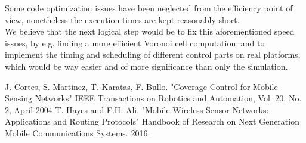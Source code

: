 \documentclass[a4paper,11pt,oneside]{book}
\begin{document}
	Some code optimization issues have been neglected from the efficiency point of view, nonetheless the execution times are kept reasonably short.\\
	We believe that the next logical step would be to fix this aforementioned speed issues, by e.g. finding a more efficient Voronoi cell computation, and to implement the timing and scheduling of different control parts on real platforms, which would be way easier and of more significance than only the simulation.
	
	
	\begin{thebibliography}{9}             %
		
		
		
		 J. Cortes, S. Martinez, T. Karatas, F. Bullo. "Coverage Control for Mobile Sensing Networks"
		IEEE Transactions on Robotics and Automation, Vol. 20, No. 2, April 2004
		 T. Hayes and F.H. Ali. "Mobile Wireless Sensor Networks: Applications and Routing Protocols" Handbook of Research on Next Generation Mobile Communications Systems. 2016.
		
	\end{thebibliography}
	
	
\end{document}
